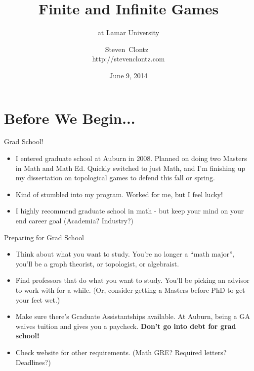 \documentclass{beamer}
\title
{Finite and Infinite Games}
\subtitle
{at Lamar University} %
\author%
{Steven~Clontz~\\http://stevenclontz.com}%
\institute[Auburn University] %
{
  Department of Mathematics and Statistics\\
  Auburn University}
\date[14-06-09] %
{June 9, 2014}
\theoremstyle{theorem}
\theoremstyle{definition}
\newcommand{\<}{\langle}
\renewcommand{\>}{\rangle}
\begin{document}

\begin{frame}
  \titlepage
\end{frame}


\section{Before We Begin...}

\begin{frame}{Grad School!}
  \begin{itemize}
    \item I entered graduate school at Auburn in 2008. Planned on doing
          two Masters in Math and Math Ed. Quickly switched to just Math,
          and I'm finishing up my dissertation on topological games
          to defend this fall or spring.
    \pause
    \item Kind of stumbled into my program. Worked for me, but I feel lucky!
    \pause
    \item I highly recommend graduate school in math - but keep your mind on
          your end career goal (Academia? Industry?)
  \end{itemize}
\end{frame}

\begin{frame}{Preparing for Grad School}
  \begin{itemize}
    \item Think about what you want to study. You're no longer a ``math major'',
          you'll be a graph theorist, or topologist, or algebraist.
    \pause
    \item Find professors that do what you want to study. You'll be picking
          an advisor to work with for a while. (Or, consider getting a Masters
          before PhD to get your feet wet.)
    \pause
    \item Make sure there's Graduate Assistantships available. At Auburn,
          being a GA waives tuition and gives you a paycheck.
          \textbf{Don't go into debt for grad school!}
    \pause
    \item Check website for other requirements. (Math GRE? Required letters?
          Deadlines?)
  \end{itemize}
\end{frame}
\end{document}
